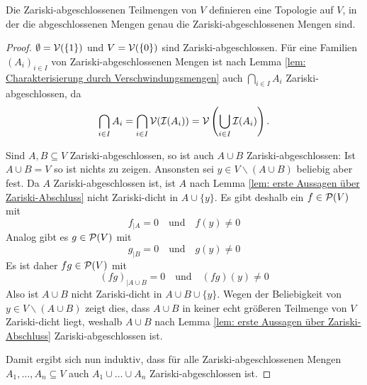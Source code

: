 \documentclass[a4paper,10pt]{article}
\begin{document}
\begin{lem}
 Die Zariski-abgeschlossenen Teilmengen von $V$ definieren eine Topologie auf $V$, in der die abgeschlossenen Mengen genau die Zariski-abgeschlossenen Mengen sind.
\end{lem}
\begin{proof}
 $\emptyset = \mathcal{V}(\{1\})$ und $V = \mathcal{V}(\{0\})$ sind Zariski-abgeschlossen. Für eine Familien $(A_i)_{i \in I}$ von Zariski-abgeschlossenen Mengen ist nach Lemma \ref{lem: Charakterisierung durch Verschwindungsmengen} auch $\bigcap_{i \in I} A_i$ Zariski-ab\-ge\-schlos\-sen, da
 \begin{align*}
  \bigcap_{i \in I} A_i
  = \bigcap_{i \in I} \mathcal{V}(\mathcal{I}(A_i))
  = \mathcal{V}\left( \bigcup_{i \in I} \mathcal{I}(A_i) \right).
 \end{align*}
 
 Sind $A, B \subseteq V$ Zariski-abgeschlossen, so ist auch $A \cup B$ Zariski-ab\-ge\-schlos\-sen: Ist $A \cup B = V$ so ist nichts zu zeigen. Ansonsten sei $y \in V \smallsetminus (A \cup B)$ beliebig aber fest. Da $A$ Zariski-abgeschlossen ist, ist $A$ nach Lemma \ref{lem: erste Aussagen über Zariski-Abschluss} nicht Zariski-dicht in $A \cup \{y\}$. Es gibt deshalb ein $f \in \mathcal{P}(V)$ mit
\[
 f_{|A} = 0 \quad \text{und} \quad f(y) \neq 0
\]
Analog gibt es $g \in \mathcal{P}(V)$ mit
\[
 g_{|B} = 0 \quad \text{und} \quad g(y) \neq 0
\]
Es ist daher $fg \in \mathcal{P}(V)$ mit
\[
 (fg)_{|A \cup B} = 0 \quad \text{und} \quad (fg)(y) \neq 0
\]
Also ist $A \cup B$ nicht Zariski-dicht in $A \cup B \cup \{y\}$. Wegen der Beliebigkeit von \mbox{$y \in V \smallsetminus (A \cup B)$} zeigt dies, dass $A \cup B$ in keiner echt größeren Teilmenge von $V$ Zariski-dicht liegt, weshalb $A \cup B$ nach Lemma \ref{lem: erste Aussagen über Zariski-Abschluss} Zariski-abgeschlossen ist.

Damit ergibt sich nun induktiv, dass für alle Zariski-abgeschlossenen Mengen $A_1, \ldots, A_n \subseteq V$ auch $A_1 \cup \ldots \cup A_n$ Zariski-abgeschlossen ist.
\end{proof}
\end{document}
